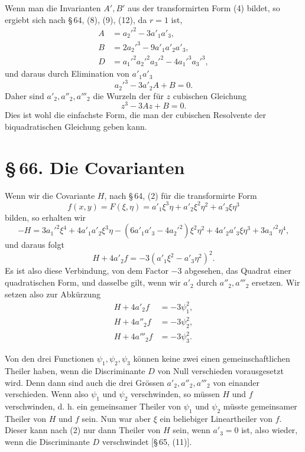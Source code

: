\documentclass[11pt]{article}
\newcommand{\sect}[2]{\section*{\S\,#1. #2}}
\begin{document}
Wenn man die Invarianten $A',B'$ aus der transformirten Form (4) bildet, so ergiebt sich nach \S\,64, (8), (9), (12), da $r=1$ ist,
\begin{equation}
\begin{aligned}
 A&=a_2'^2-3a'_1a'_3,\\
 B&=2a_2'^3-9a'_1a'_2a'_3,\\
 D&=a_1'^2a_2'^2a_3'^2-4a_1'^3a_3'^3,
\end{aligned}
\tag{11}
\end{equation}
und daraus durch Elimination von $a'_1a'_3$
\[
 a_2'^3-3a'_2A+B=0.
\]
Daher sind $a'_2,a''_2,a'''_2$ die Wurzeln der für $z$ cubischen Gleichung
\begin{equation}
 z^3-3Az+B=0.
\tag{12}
\end{equation}
Dies ist wohl die einfachste Form, die man der cubischen Resolvente der biquadratischen Gleichung geben kann.

\sect{66}{Die Covarianten}

Wenn wir die Covariante $H$, nach \S\,64, (2) für die transformirte Form
\begin{equation}
 f(x,y)=F(\xi,\eta)=a'_1\xi^3\eta+a'_2\xi^2\eta^2+a'_3\xi\eta^3
\tag{1}
\end{equation}
bilden, so erhalten wir
\begin{equation}
 -H=3a_1'^2\xi^4+4a'_1a'_2\xi^3\eta-(6a'_1a'_3-4a_2'^2)\xi^2\eta^2+4a'_2a'_3\xi\eta^3+3a_3'^2\eta^4,
\tag{2}
\end{equation}
und daraus folgt
\begin{equation}
 H+4a'_2f=-3(a'_1\xi^2-a'_3\eta^2)^2.
\tag{3}
\end{equation}
Es ist also diese Verbindung, von dem Factor $-3$ abgesehen, das Quadrat einer quadratischen Form, und dasselbe gilt, wenn wir $a'_2$ durch $a''_2,a'''_2$ ersetzen. Wir setzen also zur Abkürzung
\begin{equation}
\begin{aligned}
 H+4a'_2f&=-3\psi_1^2,\\
 H+4a''_2f&=-3\psi_2^2,\\
 H+4a'''_2f&=-3\psi_3^2.
\end{aligned}
\tag{4}
\end{equation}

Von den drei Functionen $\psi_1,\psi_2,\psi_3$ können keine zwei einen gemeinschaftlichen Theiler haben, wenn die Discriminante $D$ von Null verschieden vorausgesetzt wird. Denn dann sind auch die drei Grössen $a'_2,a''_2,a'''_2$ von einander verschieden. Wenn also $\psi_1$ und $\psi_2$ verschwinden, so müssen $H$ und $f$ verschwinden, d. h. ein gemeinsamer Theiler von $\psi_1$ und $\psi_2$ müsste gemeinsamer Theiler von $H$ und $f$ sein. Nun war aber $\xi$ ein beliebiger Lineartheiler von $f$. Dieser kann nach (2) nur dann Theiler von $H$ sein, wenn $a'_3=0$ ist, also wieder, wenn die Discriminante $D$ verschwindet [\S\,65, (11)].
\end{document}
